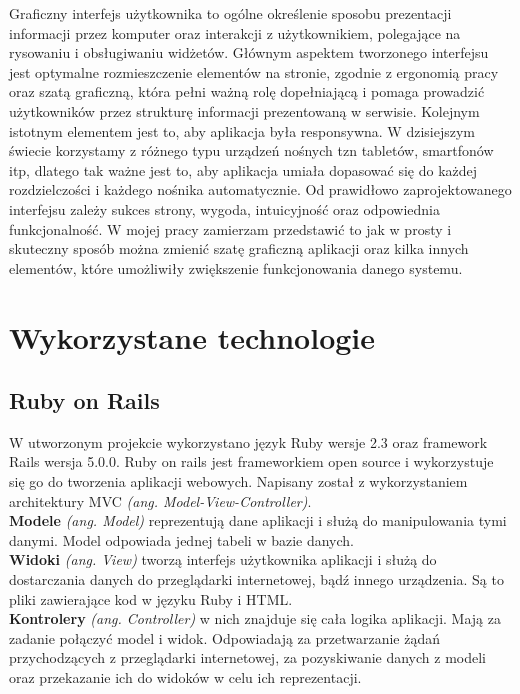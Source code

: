 \documentclass[openright]{xmgr}
\begin{document}
	Graficzny interfejs użytkownika to ogólne określenie sposobu prezentacji informacji przez komputer oraz interakcji z użytkownikiem, polegające na rysowaniu i obsługiwaniu widżetów. Głównym aspektem tworzonego interfejsu jest optymalne rozmieszczenie elementów na stronie, zgodnie z ergonomią pracy oraz szatą graficzną, która pełni ważną rolę dopełniającą i pomaga prowadzić użytkowników przez strukturę informacji prezentowaną w serwisie. Kolejnym istotnym elementem jest to, aby aplikacja była responsywna. W dzisiejszym świecie korzystamy z różnego typu urządzeń nośnych tzn tabletów, smartfonów itp, dlatego tak ważne jest to, aby aplikacja umiała dopasować się do każdej rozdzielczości i każdego nośnika automatycznie. Od prawidłowo zaprojektowanego interfejsu zależy sukces strony, wygoda, intuicyjność oraz odpowiednia funkcjonalność. W mojej pracy zamierzam przedstawić to jak w prosty i skuteczny sposób można zmienić szatę graficzną aplikacji oraz kilka innych elementów, które umożliwiły zwiększenie funkcjonowania danego systemu.
	
	\chapter{Wykorzystane technologie}
	
	\section{Ruby on Rails}
	
	W utworzonym projekcie wykorzystano język Ruby wersje 2.3 oraz framework Rails wersja 5.0.0. Ruby on rails jest frameworkiem open source i wykorzystuje się go do tworzenia aplikacji webowych. Napisany został z wykorzystaniem architektury MVC \emph{(ang. Model-View-Controller)}.\\
	
	\textbf{Modele} \emph{(ang. Model)} reprezentują dane aplikacji i służą do manipulowania tymi danymi. Model odpowiada jednej tabeli w bazie danych.\\
	
	
	\textbf{Widoki} \emph{(ang. View)} tworzą interfejs użytkownika aplikacji i służą do dostarczania danych do przeglądarki internetowej, bądź innego urządzenia. Są to pliki zawierające kod w języku Ruby i HTML.\\
	
	\textbf{Kontrolery} \emph{(ang. Controller)} w nich znajduje się cała logika aplikacji. Mają za zadanie połączyć model i widok. Odpowiadają za przetwarzanie żądań przychodzących z przeglądarki internetowej, za pozyskiwanie danych z modeli oraz przekazanie ich do widoków w celu ich reprezentacji.
	\newpage
	
\end{document}
